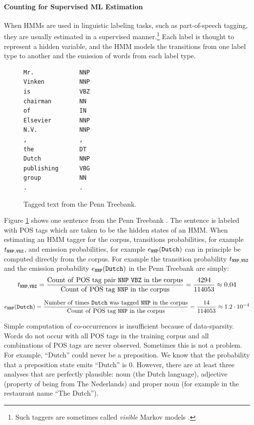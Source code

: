 \paragraph{Counting for Supervised ML Estimation}\label{sec:hmm-counting}
When HMMs are used in linguistic labeling tasks, such as
part-of-speech tagging, they are usually estimated in a supervised
manner.\footnote{Such taggers are sometimes called {\it
    visible} Markov models \citep{Manning1999}.} Each label is thought
to represent a hidden variable, and the HMM models the transitions
from one label type to another and the emission of words from each
label type.

\begin{figure}[!htb]
\begin{center}
\begin{BVerbatim}
Mr.             NNP
Vinken          NNP
is              VBZ
chairman        NN
of              IN
Elsevier        NNP
N.V.            NNP
,               ,
the             DT
Dutch           NNP
publishing      VBG
group           NN
.               .
\end{BVerbatim}
\end{center}
\caption{Tagged text from the Penn Treebank.}\label{penn-figure}
\end{figure}

Figure \ref{penn-figure} shows one sentence from the Penn Treebank \citep{Marcus1993}. The sentence is labeled with POS tags which are taken to be the hidden states of an HMM. When estimating an HMM tagger for the corpus, transitions probabilities, for example $t_{{\tt NNP}, {\tt VBZ}}$, and emission probabilities, for example $e_{{\tt NNP}}({\tt Dutch})$ can in principle be computed directly from the corpus. For example the transition probability $t_{{\tt NNP}, {\tt VBZ}}$ and the emission probability $e_{{\tt NNP}}({\tt Dutch})$ in the Penn Treebank are simply:
$$t_{{\tt NNP}, {\tt VBZ}} = \frac{{\rm Count\ of\ POS\ tag\ pair\ {\tt NNP}\ {\tt VBZ}\ in\ the\ corpus}}{{\rm Count\ of\ POS\ tag\ {\tt NNP}\ in\ the\ corpus}} = \frac{4294}{114053} \approx 0.04$$

$$e_{{\tt NNP}}({\tt Dutch}) = \frac{{\rm Number\ of\ times\ {\tt Dutch}\ was\ tagged\ {\tt NNP}\ in\ the\ corpus}}{{\rm Count\ of\ POS\ tag\ {\tt NNP}\ in\ the\ corpus}} = \frac{14}{114053} \approx 1.2 \cdot 10^{-4}$$

Simple computation of co-occurrences is insufficient because of
data-sparsity. Words do not occur with all POS tags in the training
corpus and all combinations of POS tags are never observed. Sometimes
this is not a problem. For example, ``Dutch'' could never be a
preposition. We know that the probability that a preposition state
emits ``Dutch'' is $0$. However, there are at least three analyses
that are perfectly plausible: noun (the Dutch language), adjective
(property of being from The Nederlands) and proper noun (for example
in the restaurant name ``The Dutch'').

